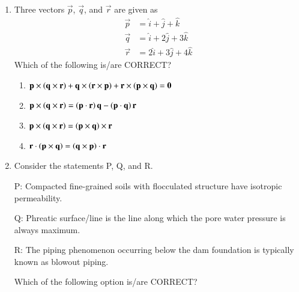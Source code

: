 \documentclass[journal,12pt,onecolumn]{article}
\theoremstyle{remark}
\begin{document}
\begin{enumerate}
    \hfill{}
    \begin{enumerate}
    \end{enumerate}
    
    \item Three vectors $\vec{p}$, $\vec{q}$, and $\vec{r}$ are given as
    \begin{align}
        \vec{p} &= \hat{i} + \hat{j} + \hat{k} \\
        \vec{q} &= \hat{i} + 2\hat{j} + 3\hat{k} \\
        \vec{r} &= 2\hat{i} + 3\hat{j} + 4\hat{k}
    \end{align}
    Which of the following is/are CORRECT?
    
    \hfill{}
    \begin{enumerate}
        \item $\mathbf{p} \times \left(\mathbf{q} \times \mathbf{r}\right) + \mathbf{q} \times \left(\mathbf{r} \times \mathbf{p}\right) + \mathbf{r} \times \left(\mathbf{p} \times \mathbf{q}\right) = \mathbf{0}$
        \item $\mathbf{p} \times \left(\mathbf{q} \times \mathbf{r}\right) = \left(\mathbf{p} \cdot \mathbf{r}\right)\mathbf{q} - \left(\mathbf{p} \cdot \mathbf{q}\right)\mathbf{r}$
        \item $\mathbf{p} \times \left(\mathbf{q} \times \mathbf{r}\right) = \left(\mathbf{p} \times \mathbf{q}\right) \times \mathbf{r}$
        \item $\mathbf{r} \cdot \left(\mathbf{p} \times \mathbf{q}\right) = \left(\mathbf{q} \times \mathbf{p}\right) \cdot \mathbf{r}$
    \end{enumerate}

    \item Consider the statements P, Q, and R.
    
    P: Compacted fine-grained soils with flocculated structure have isotropic
    permeability.
    
    Q: Phreatic surface/line is the line along which the pore water pressure is always
    maximum.
    
    R: The piping phenomenon occurring below the dam foundation is typically known
    as blowout piping.
    
    Which of the following option is/are CORRECT?
    

\end{enumerate}
\end{document}
